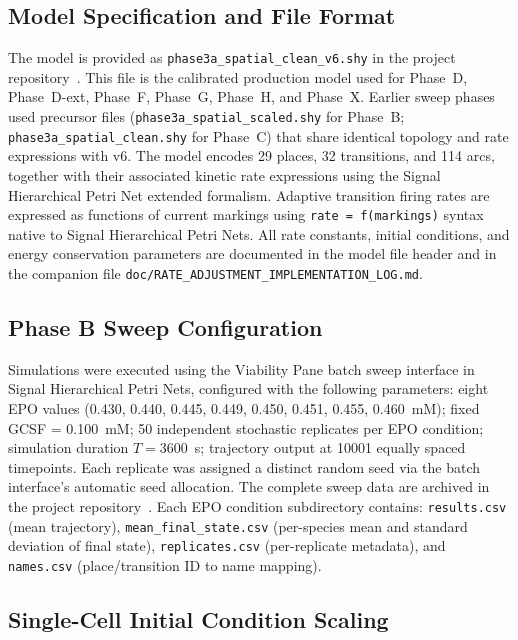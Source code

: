 
\subsection{Model Specification and File Format}

The model is provided as \texttt{phase3a\_spatial\_clean\_v6.shy} in the project repository~\cite{shypn2026}. This file is the calibrated production model used for Phase~D, Phase~D-ext, Phase~F, Phase~G, Phase~H, and Phase~X. Earlier sweep phases used precursor files (\texttt{phase3a\_spatial\_scaled.shy} for Phase~B; \texttt{phase3a\_spatial\_clean.shy} for Phase~C) that share identical topology and rate expressions with v6. The model encodes 29 places, 32 transitions, and 114 arcs, together with their associated kinetic rate expressions using the Signal Hierarchical Petri Net extended formalism. Adaptive transition firing rates are expressed as functions of current markings using \texttt{rate = f(markings)} syntax native to Signal Hierarchical Petri Nets. All rate constants, initial conditions, and energy conservation parameters are documented in the model file header and in the companion file \texttt{doc/RATE\_ADJUSTMENT\_IMPLEMENTATION\_LOG.md}.

\subsection{Phase B Sweep Configuration}

Simulations were executed using the Viability Pane batch sweep interface in Signal Hierarchical Petri Nets, configured with the following parameters: eight EPO values (0.430, 0.440, 0.445, 0.449, 0.450, 0.451, 0.455, 0.460~mM); fixed GCSF = 0.100~mM; 50 independent stochastic replicates per EPO condition; simulation duration $T = 3600$~s; trajectory output at 10001 equally spaced timepoints. Each replicate was assigned a distinct random seed via the batch interface's automatic seed allocation. The complete sweep data are archived in the project repository~\cite{shypn2026}. Each EPO condition subdirectory contains: \texttt{results.csv} (mean trajectory), \texttt{mean\_final\_state.csv} (per-species mean and standard deviation of final state), \texttt{replicates.csv} (per-replicate metadata), and \texttt{names.csv} (place/transition ID to name mapping).

\subsection{Single-Cell Initial Condition Scaling}

